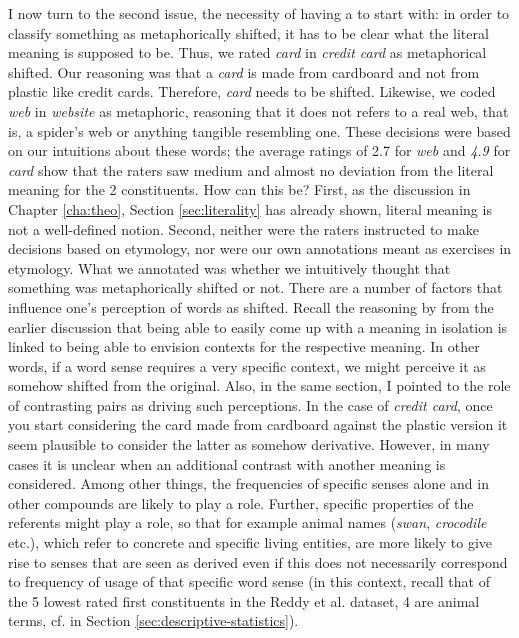 I now turn to the second issue, the necessity of having a
 to start with: in order to classify something as
metaphorically shifted, it has to be clear what the literal meaning is
supposed to be. Thus, we rated \emph{card} in \emph{credit card} as
metaphorical shifted. Our reasoning was that a \emph{card} is made
from cardboard and not from plastic like credit cards. Therefore,
\emph{card} needs to be shifted. Likewise, we coded \emph{web} in
\emph{website} as metaphoric, reasoning that it does not refers to a
real web, that is, a spider's web or anything tangible resembling
one. These decisions were based on our intuitions about these words;
the average ratings of 2.7 for \emph{web} and \emph{4.9} for
\emph{card} show that the raters saw medium and almost no deviation
from the literal meaning for the 2 constituents. How can this be?
First, as the discussion in Chapter \ref{cha:theo}, Section
\ref{sec:literality} has already shown, literal meaning is not a
well-defined notion. Second, neither were the raters instructed to
make decisions based on etymology, nor were our own annotations meant
as exercises in etymology. What we annotated was whether we
intuitively thought that something was metaphorically shifted or
not. There are a number of factors that influence one's perception of
words as shifted. Recall the reasoning by \citet{Jaszczolt:2016} from
the earlier discussion that being able to easily come up with a
meaning in isolation is linked to being able to envision contexts for
the respective meaning. In other words, if a word sense requires a
very specific context, we might perceive it as somehow shifted from
the original. Also, in the same section, I pointed to the role of
contrasting pairs as driving such perceptions. In the case of
\emph{credit card}, once you start considering the card made from
cardboard against the plastic version it seem plausible to consider
the latter as somehow derivative. However, in many cases it is unclear
when an additional contrast with another meaning is considered. Among
other things, the frequencies of specific senses alone and in other
compounds are likely to play a role. Further, specific properties of
the referents might play a role, so that for example animal names
(\emph{swan}, \emph{crocodile} etc.), which refer to concrete and
specific living entities, are more likely to give rise to senses that
are seen as derived even if this does not necessarily correspond to
frequency of usage of that specific word sense (in this context,
recall that of the 5 lowest rated first constituents in the Reddy et
al. dataset, 4 are animal terms, cf.
 in Section
\ref{sec:descriptive-statistics}).

